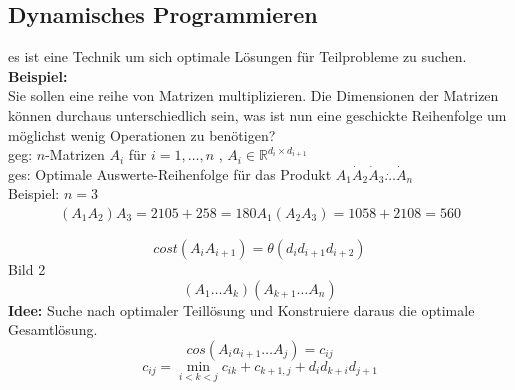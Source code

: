 \documentclass[a4paper,twoside,10pt]{report}
\begin{document}
\subsection{Dynamisches Programmieren}
es ist eine Technik um sich optimale Lösungen für Teilprobleme zu suchen.\\
\textbf{Beispiel:}\\
Sie sollen eine reihe von Matrizen multiplizieren. Die Dimensionen der Matrizen können durchaus unterschiedlich sein, was ist nun eine geschickte Reihenfolge um möglichst wenig Operationen zu benötigen?\\
geg: $n$-Matrizen $A_i$ für $i=1,\hdots,n$ , $A_i\in\mathbb R^{d_i\times d_{i+1}}$\\
ges: Optimale Auswerte-Reihenfolge für das Produkt $A_1 \dot A_2 \dot A_3 \dot \hdots \dot A_n$\\
Beispiel: $n=3$\\
\begin{align*}
(A_1 A_2) A_3 = 2 10 5 + 2 5 8 =180
A_1 (A_2 A_3) = 10 5 8 + 2 10 8= 560
\end{align*}

\[cost(A_i A_{i+1})=\theta(d_i d_{i+1} d_{i+2})\]
Bild 2\\
\[(A_1\hdots A_k)(A_{k+1}\hdots A_n)\]
\textbf{Idee:} Suche nach optimaler Teillösung und Konstruiere daraus die optimale Gesamtlösung.\\
\[cos(A_i a_{i+1} \hdots A_j)=c_{ij}\]
\[c_{ij}=\min_{i<k<j}c_{ik}+c_{k+1,j}+d_{i}d_{k+i}d_{j+1}\]
\end{document}
